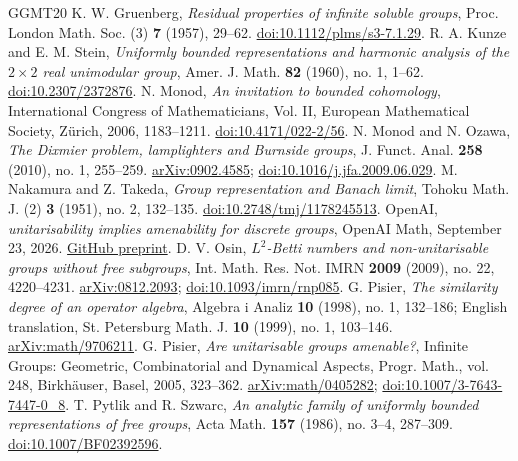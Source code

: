\documentclass[a4paper,11pt]{amsproc}
\numberwithin{equation}{section}
\theoremstyle{definition}
\begin{document}
\begin{thebibliography}{GGMT20}
 K. W. Gruenberg, \emph{Residual properties of infinite soluble groups}, Proc. London Math. Soc. (3) \textbf{7} (1957), 29--62. \href{https://doi.org/10.1112/plms/s3-7.1.29}{doi:10.1112/plms/s3-7.1.29}.
 R. A. Kunze and E. M. Stein, \emph{Uniformly bounded representations and harmonic analysis of the $2\times2$ real unimodular group}, Amer. J. Math. \textbf{82} (1960), no. 1, 1--62. \href{https://doi.org/10.2307/2372876}{doi:10.2307/2372876}.
 N. Monod, \emph{An invitation to bounded cohomology}, International Congress of Mathematicians, Vol. II, European Mathematical Society, Z\"urich, 2006, 1183--1211. \href{https://doi.org/10.4171/022-2/56}{doi:10.4171/022-2/56}.
 N. Monod and N. Ozawa, \emph{The Dixmier problem, lamplighters and Burnside groups}, J. Funct. Anal. \textbf{258} (2010), no. 1, 255--259. \href{https://arxiv.org/abs/0902.4585}{arXiv:0902.4585}; \href{https://doi.org/10.1016/j.jfa.2009.06.029}{doi:10.1016/j.jfa.2009.06.029}.
 M. Nakamura and Z. Takeda, \emph{Group representation and Banach limit}, Tohoku Math. J. (2) \textbf{3} (1951), no. 2, 132--135. \href{https://doi.org/10.2748/tmj/1178245513}{doi:10.2748/tmj/1178245513}.
 OpenAI, \emph{unitarisability implies amenability for discrete groups}, OpenAI Math, September 23, 2026. \href{https://github.com/openai/math/blob/main/preprints/unitarisability-Implies-Amenability-for-Countable-Groups-September-23-2026/paper.pdf}{GitHub preprint}.
 D. V. Osin, \emph{$L^2$-Betti numbers and non-unitarisable groups without free subgroups}, Int. Math. Res. Not. IMRN \textbf{2009} (2009), no. 22, 4220--4231. \href{https://arxiv.org/abs/0812.2093}{arXiv:0812.2093}; \href{https://doi.org/10.1093/imrn/rnp085}{doi:10.1093/imrn/rnp085}.
 G. Pisier, \emph{The similarity degree of an operator algebra}, Algebra i Analiz \textbf{10} (1998), no. 1, 132--186; English translation, St. Petersburg Math. J. \textbf{10} (1999), no. 1, 103--146. \href{https://arxiv.org/abs/math/9706211}{arXiv:math/9706211}.
 G. Pisier, \emph{Are unitarisable groups amenable?}, Infinite Groups: Geometric, Combinatorial and Dynamical Aspects, Progr. Math., vol. 248, Birkh\"auser, Basel, 2005, 323--362. \href{https://arxiv.org/abs/math/0405282}{arXiv:math/0405282}; \href{https://doi.org/10.1007/3-7643-7447-0_8}{doi:10.1007/3-7643-7447-0\_8}.
 T. Pytlik and R. Szwarc, \emph{An analytic family of uniformly bounded representations of free groups}, Acta Math. \textbf{157} (1986), no. 3--4, 287--309. \href{https://doi.org/10.1007/BF02392596}{doi:10.1007/BF02392596}.

\end{thebibliography}
\end{document}
